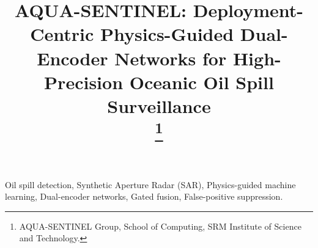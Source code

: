\documentclass[conference]{IEEEtran}
\begin{document}
\title{AQUA-SENTINEL: Deployment-Centric Physics-Guided Dual-Encoder Networks for High-Precision Oceanic Oil Spill Surveillance\\
\thanks{AQUA-SENTINEL Group, School of Computing, SRM Institute of Science and Technology.}
}

\author{
\and
{}
\and
{}
}

\maketitle



\begin{IEEEkeywords}
Oil spill detection, Synthetic Aperture Radar (SAR), Physics-guided machine learning, Dual-encoder networks, Gated fusion, False-positive suppression.
\end{IEEEkeywords}
















\end{document}
